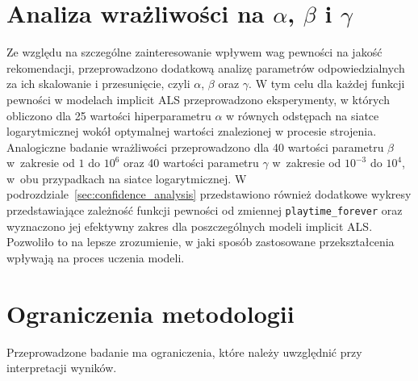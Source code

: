 \section{Analiza wrażliwości na \texorpdfstring{$\alpha$}{alpha}, \texorpdfstring{$\beta$}{beta} i \texorpdfstring{$\gamma$}{gamma}}

Ze względu na szczególne zainteresowanie wpływem wag pewności na jakość rekomendacji, przeprowadzono dodatkową analizę parametrów odpowiedzialnych za ich skalowanie i przesunięcie, czyli $\alpha$, $\beta$ oraz $\gamma$. W tym celu dla każdej funkcji pewności w modelach implicit ALS przeprowadzono eksperymenty, w których obliczono \ndcg{} dla 25 wartości hiperparametru $\alpha$ w równych odstępach na siatce logarytmicznej wokół optymalnej wartości znalezionej w procesie strojenia. Analogiczne badanie wrażliwości przeprowadzono dla 40 wartości parametru $\beta$ w~zakresie od $1$ do $10^{6}$ oraz 40 wartości parametru $\gamma$
w~zakresie od $10^{-3}$ do $10^{4}$, w~obu przypadkach na siatce logarytmicznej. W podrozdziale~\ref{sec:confidence_analysis} przedstawiono również dodatkowe wykresy przedstawiające zależność funkcji pewności od zmiennej \texttt{playtime\_forever} oraz wyznaczono jej efektywny zakres dla poszczególnych modeli implicit ALS. Pozwoliło to na lepsze zrozumienie, w jaki sposób zastosowane przekształcenia wpływają na proces uczenia modeli.


\section{Ograniczenia metodologii}

Przeprowadzone badanie ma ograniczenia, które należy uwzględnić przy
interpretacji wyników.

